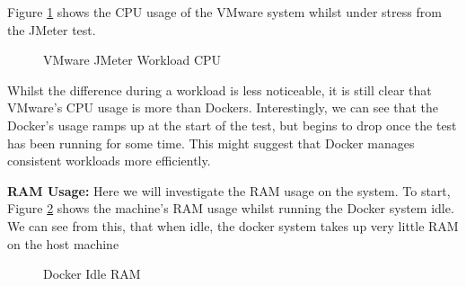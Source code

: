 Figure \ref{fig:VMwareCPUwork} shows the CPU usage of the VMware system whilst under stress from the JMeter test.
\begin{figure}[H]
\caption{VMware JMeter Workload CPU}
\label{fig:VMwareCPUwork}
\centering
\end{figure}

Whilst the difference during a workload is less noticeable, it is still clear that VMware's CPU usage is more than Dockers. Interestingly, we can see that the Docker's usage ramps up at the start of the test, but begins to drop once the test has been running for some time. This might suggest that Docker manages consistent workloads more efficiently.

\textbf{RAM Usage:}
Here we will investigate the RAM usage on the system. To start, Figure \ref{fig:DockerRAMidle} shows the machine's RAM usage whilst running the Docker system idle. We can see from this, that when idle, the docker system takes up very little RAM on the host machine

\begin{figure}[H]
\caption{Docker Idle RAM}
\label{fig:DockerRAMidle}
\centering
\end{figure}


